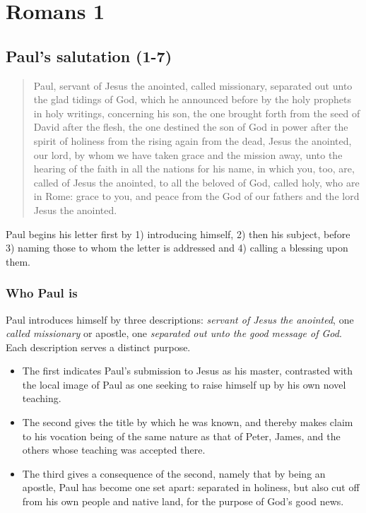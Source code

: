 \chapter{Romans 1}
\section{Paul's salutation (1-7)}
\begin{quote}
	Paul, servant of Jesus the anointed, called missionary, separated out unto the glad tidings of God, which he announced before by the holy prophets in holy writings, concerning his son, the one brought forth from the seed of David after the flesh, the one destined the son of God in power after the spirit of holiness from the rising again from the dead, Jesus the anointed, our lord, by whom we have taken grace and the mission away, unto the hearing of the faith in all the nations for his name, in which you, too, are, called of Jesus the anointed, to all the beloved of God, called holy, who are in Rome: grace to you, and peace from the God of our fathers and the lord Jesus the anointed.
\end{quote}

Paul begins his letter first by 1) introducing himself, 2) then his subject, before 3) naming those to whom the letter is addressed and 4) calling a blessing upon them. 

\subsection{Who Paul is}
Paul introduces himself by three descriptions: \emph{servant of Jesus the anointed}, one \emph{called missionary} or apostle, one \emph{separated out unto the good message of God}. Each description serves a distinct purpose. 
\begin{itemize}
	\item The first indicates Paul's submission to Jesus as his master, contrasted with the local image of Paul as one seeking to raise himself up by his own novel teaching. 
	\item The second gives the title by which he was known, and thereby makes claim to his vocation being of the same nature as that of Peter, James, and the others whose teaching was accepted there.
	\item The third gives a consequence of the second, namely that by being an apostle, Paul has become one set apart: separated in holiness, but also cut off from his own people and native land, for the purpose of God's good news. 
\end{itemize}


